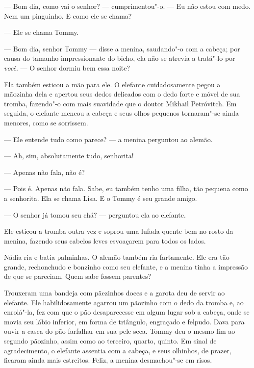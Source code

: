 --- Bom dia, como vai o senhor? --- cumprimentou"-o. --- Eu não estou com
medo. Nem um pinguinho. E como ele se chama?

--- Ele se chama Tommy.

--- Bom dia, senhor Tommy --- disse a menina, saudando"-o com a cabeça;
por causa do tamanho impressionante do bicho, ela não se atrevia a
tratá"-lo por \emph{você}. --- O senhor dormiu bem essa noite?

Ela também esticou a mão para ele. O elefante cuidadosamente pegou a
mãozinha dela e apertou seus dedos delicados com o dedo forte e móvel
de sua tromba, fazendo"-o com mais suavidade que o doutor Mikhail
Petróvitch. Em seguida, o elefante meneou a cabeça e seus olhos pequenos
tornaram"-se ainda menores, como se sorrissem.

--- Ele entende tudo como parece? --- a menina perguntou ao alemão.

--- Ah, sim, absolutamente tudo, senhorita!

--- Apenas não fala, não é?

--- Pois é. Apenas não fala. Sabe, eu também tenho uma filha, tão
pequena como a senhorita. Ela se chama Lisa. E o Tommy é seu grande
amigo.

--- O senhor já tomou seu chá? --- perguntou ela ao
elefante.

Ele esticou a tromba outra vez e soprou uma lufada quente bem no
rosto da menina, fazendo seus cabelos leves esvoaçarem para todos os
lados.

Nádia ria e batia palminhas. O alemão também ria fartamente. Ele era
tão grande, rechonchudo e bonzinho como seu elefante, e a menina tinha a
impressão de que se pareciam. Quem sabe fossem parentes?


Trouxeram uma bandeja com pãezinhos doces e a garota deu de servir ao
elefante. Ele habilidosamente agarrou um pãozinho com o dedo da tromba
e, ao enrolá"-la, fez com que o pão desaparecesse em algum lugar sob a
cabeça, onde se movia seu lábio inferior, em forma de triângulo, engraçado e felpudo. Dava para ouvir a casca do pão farfalhar em sua pele seca.
Tommy deu o mesmo fim ao segundo pãozinho, assim como ao terceiro,
quarto, quinto. Em sinal de agradecimento, o elefante assentia com a
cabeça, e seus olhinhos, de prazer, ficaram ainda mais estreitos.
Feliz, a menina desmachou"-se em risos.

